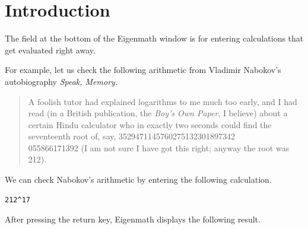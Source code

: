 
\section{Introduction}
The field at the bottom of the Eigenmath window is for entering
calculations that get evaluated right away.

\begin{center}
\end{center}

For example, let us check the following
arithmetic from Vladimir Nabokov's autobiography {\it Speak, Memory.}

\begin{quote}
A foolish tutor had explained logarithms to me much too early, and I had
read (in a British publication, the {\it Boy's Own Paper}, I believe)
about a certain Hindu calculator who in exactly two seconds could find the
seventeenth root of, say,
3529471145760275132301897342\\055866171392
(I am not sure I have got this right; anyway the root was 212).
\end{quote}

We can check Nabokov's arithmetic by entering the following calculation.

\begin{Verbatim}[formatcom=\color{blue}]
212^17
\end{Verbatim}

After pressing the return key, Eigenmath displays the following result.

